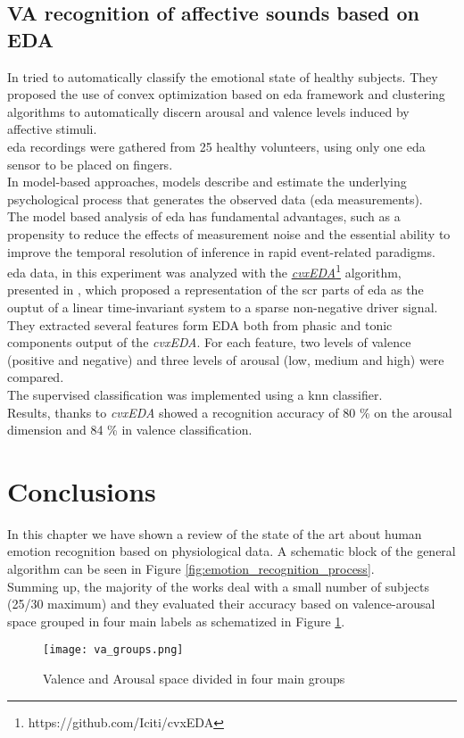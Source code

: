 \subsection{VA recognition of affective sounds based on EDA}
In \cite{greco2016arousal} tried to automatically classify the emotional state of healthy subjects. They proposed the use of convex optimization based on \gls{eda} framework and clustering algorithms to automatically discern arousal and valence levels induced by affective stimuli.
\\ \indent
\gls{eda} recordings were gathered from 25 healthy volunteers, using only one \gls{eda} sensor to be placed on fingers.
\\
In model-based approaches, models describe and estimate the underlying psychological process that generates the observed data (\gls{eda} measurements).
\\
The model based analysis of \gls{eda} has fundamental advantages, such as a propensity to reduce the effects of measurement noise and the essential ability to improve the temporal resolution of inference in rapid event-related paradigms.
\\ \indent
\gls{eda} data, in this experiment was analyzed with the \href{https://github.com/Iciti/cvxEDA}{\textit{cvxEDA}}\footnote{https://github.com/Iciti/cvxEDA} algorithm, presented in \cite{greco2015cvxeda}, which proposed a representation of the \gls{scr} parts of \gls{eda} as the ouptut of a linear time-invariant system to a sparse non-negative driver signal.
\\ \indent
They extracted several features form EDA both from phasic and tonic components output of the \textit{cvxEDA}. For each feature, two levels of valence (positive and negative) and three levels of arousal (low, medium and high) were compared.
\\
The supervised classification was implemented using a \gls{knn} classifier.
\\ \indent
Results, thanks to \textit{cvxEDA} showed a recognition accuracy of 80 \% on the arousal dimension and 84 \% in valence classification.

\newpage
\section{Conclusions}
In this chapter we have shown a review of the state of the art about human emotion recognition based on physiological data. A schematic block of the general algorithm can be seen in Figure \ref{fig:emotion_recognition_process}.
\\
Summing up, the majority of the works deal with a small number of subjects (25/30 maximum) and they evaluated their accuracy based on valence-arousal space grouped in four main labels as schematized in Figure \ref{fig:va_groups}.
\begin{figure}[h]
    \centering
    \texttt{[image: va\_groups.png]} 
	\caption{Valence and Arousal space divided in four main groups}
    \label{fig:va_groups}
\end{figure}